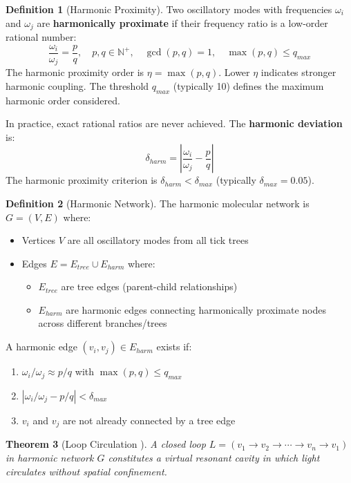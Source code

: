 \documentclass[11pt,a4paper]{article}
\newtheorem{theorem}{Theorem}[section]
\theoremstyle{definition}
\newtheorem{definition}[theorem]{Definition}
\theoremstyle{remark}
\begin{document}
\begin{definition}[Harmonic Proximity]
\label{def:harmonic_proximity}
Two oscillatory modes with frequencies $\omega_i$ and $\omega_j$ are \textbf{harmonically proximate} if their frequency ratio is a low-order rational number:
\begin{equation}
\frac{\omega_i}{\omega_j} = \frac{p}{q}, \quad p,q \in \mathbb{N}^+, \quad \gcd(p,q)=1, \quad \max(p,q) \leq q_{max}
\end{equation}
The harmonic proximity order is $\eta = \max(p,q)$. Lower $\eta$ indicates stronger harmonic coupling. The threshold $q_{max}$ (typically 10) defines the maximum harmonic order considered.

In practice, exact rational ratios are never achieved. The \textbf{harmonic deviation} is:
\begin{equation}
\delta_{harm} = \left|\frac{\omega_i}{\omega_j} - \frac{p}{q}\right|
\end{equation}
The harmonic proximity criterion is $\delta_{harm} < \delta_{max}$ (typically $\delta_{max} = 0.05$).
\end{definition}

\begin{definition}[Harmonic Network]
\label{def:harmonic_network}
The harmonic molecular network is $G = (V, E)$ where:
\begin{itemize}
\item Vertices $V$ are all oscillatory modes from all tick trees
\item Edges $E = E_{tree} \cup E_{harm}$ where:
\begin{itemize}
\item $E_{tree}$ are tree edges (parent-child relationships)
\item $E_{harm}$ are harmonic edges connecting harmonically proximate nodes across different branches/trees
\end{itemize}
\end{itemize}
A harmonic edge $(v_i, v_j) \in E_{harm}$ exists if:
\begin{enumerate}
\item $\omega_i/\omega_j \approx p/q$ with $\max(p,q) \leq q_{max}$
\item $|\omega_i/\omega_j - p/q| < \delta_{max}$
\item $v_i$ and $v_j$ are not already connected by a tree edge
\end{enumerate}
\end{definition}

\begin{theorem}[Loop Circulation \cite{sachikonye2026harmonic}]
\label{thm:loop_circulation}
A closed loop $L = (v_1 \to v_2 \to \cdots \to v_n \to v_1)$ in harmonic network $G$ constitutes a virtual resonant cavity in which light circulates without spatial confinement.
\end{theorem}
\end{document}
